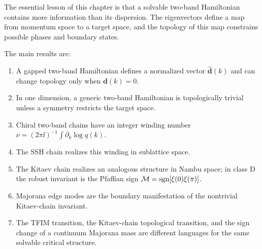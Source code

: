 The essential lesson of this chapter is that a solvable two-band Hamiltonian
contains more information than its dispersion.  The eigenvectors define a map
from momentum space to a target space, and the topology of this map constrains
possible phases and boundary states.

The main results are:
\begin{enumerate}[label=(\roman*)]
    \item A gapped two-band Hamiltonian defines a normalized vector
    $\widehat{\bm d}(k)$ and can change topology only when $\bm d(k)=0$.
    \item In one dimension, a generic two-band Hamiltonian is topologically
    trivial unless a symmetry restricts the target space.
    \item Chiral two-band chains have an integer winding number
    $\nu=(2\pi\ii)^{-1}\int\partial_k\log q(k)$.
    \item The SSH chain realizes this winding in sublattice space.
    \item The Kitaev chain realizes an analogous structure in Nambu space; in
    class D the robust invariant is the Pfaffian sign
    $\mathcal{M}=\operatorname{sgn}[\xi(0)\xi(\pi)]$.
    \item Majorana edge modes are the boundary manifestation of the nontrivial
    Kitaev-chain invariant.
    \item The TFIM transition, the Kitaev-chain topological transition, and the
    sign change of a continuum Majorana mass are different languages for the
    same solvable critical structure.
\end{enumerate}
